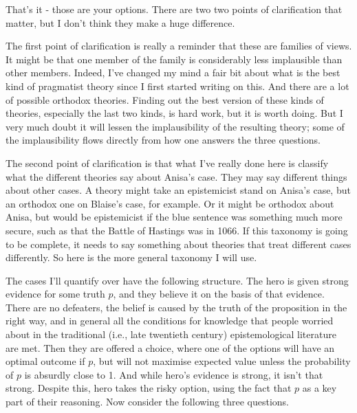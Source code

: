\documentclass[11pt,]{book}
\begin{document}
That's it - those are your options. There are two two points of clarification that matter, but I don't think they make a huge difference.

The first point of clarification is really a reminder that these are families of views. It might be that one member of the family is considerably less implausible than other members. Indeed, I've changed my mind a fair bit about what is the best kind of pragmatist theory since I first started writing on this. And there are a lot of possible orthodox theories. Finding out the best version of these kinds of theories, especially the last two kinds, is hard work, but it is worth doing. But I very much doubt it will lessen the implausibility of the resulting theory; some of the implausibility flows directly from how one answers the three questions.

The second point of clarification is that what I've really done here is classify what the different theories say about Anisa's case. They may say different things about other cases. A theory might take an epistemicist stand on Anisa's case, but an orthodox one on Blaise's case, for example. Or it might be orthodox about Anisa, but would be epistemicist if the blue sentence was something much more secure, such as that the Battle of Hastings was in 1066. If this taxonomy is going to be complete, it needs to say something about theories that treat different cases differently. So here is the more general taxonomy I will use.

The cases I'll quantify over have the following structure. The hero is given strong evidence for some truth \(p\), and they believe it on the basis of that evidence. There are no defeaters, the belief is caused by the truth of the proposition in the right way, and in general all the conditions for knowledge that people worried about in the traditional (i.e., late twentieth century) epistemological literature are met. Then they are offered a choice, where one of the options will have an optimal outcome if \(p\), but will not maximise expected value unless the probability of \(p\) is absurdly close to 1. And while hero's evidence is strong, it isn't that strong. Despite this, hero takes the risky option, using the fact that \(p\) as a key part of their reasoning. Now consider the following three questions.
\end{document}
